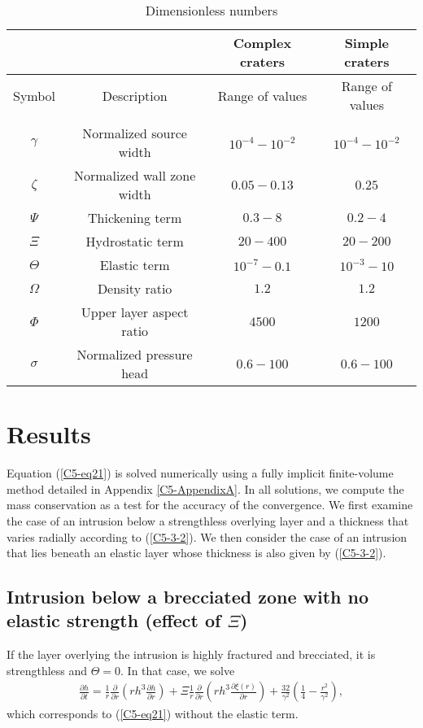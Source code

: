 \begin{table}[h!]
  \caption{Dimensionless numbers}
  \centering
  \begin{tabular}{c|c|c|c}
    &&Complex craters&Simple craters \\
    \hline
    Symbol& Description & Range of values & Range of values \\
    \hline
    &&\\
    $\gamma$&Normalized source width& $10^{-4}-10^{-2}$ &$10^{-4}-10^{-2}$ \\
    $\zeta$& Normalized wall zone width  & $0.05-0.13$&$0.25$\\
    $\Psi$&Thickening term & $0.3-8$&$0.2-4$\\
    $\Xi$& Hydrostatic term & $20-400$&$20-200$\\
    $\Theta$ &Elastic term & $10^{-7}-0.1$&$10^{-3}-10$\\
    $\Omega$ & Density ratio & $1.2$ &$1.2$\\
    $\Phi$ & Upper layer aspect ratio & $4500$ &$1200 $\\
    $\sigma$&Normalized pressure head& $0.6-100$ & $0.6-100$ 
                                                   \label{C5-tab3}
  \end{tabular} 
\end{table}
	 
	
\section{Results}
	
Equation (\ref{C5-eq21}) is solved  numerically using a fully implicit
finite-volume method detailed in  Appendix \ref{C5-AppendixA}.  In all
solutions, we compute the mass conservation as a test for the accuracy
of the convergence. We first examine  the case of an intrusion below a
strengthless  overlying layer  and  a thickness  that varies  radially
according to (\ref{C5-3-2}). We then consider the case of an intrusion
that lies  beneath an elastic layer  whose thickness is also  given by
(\ref{C5-3-2}).
	
\subsection{Intrusion below a brecciated zone with no elastic strength
  (effect of $\Xi$)}
\label{C5-Strengthless_Layer1}
If  the  layer  overlying  the   intrusion  is  highly  fractured  and
brecciated,  it is  strengthless  and $\Theta=0$.   In  that case,  we
solve
\begin{eqnarray}
  \label{C5-eq22}
  \frac{\partial h}{\partial t}=\frac{1}{r} \frac{\partial}{\partial r}\left (rh^{3} \frac{\partial h}{\partial r} \right)+ \Xi \frac{1}{r} \frac{\partial}{\partial r}\left ( rh^{3}\frac{\partial \xi(r)}{\partial r}\right )+\frac{32}{\gamma^{2}} \left(\frac{1}{4}-\frac{r^{2}}{\gamma^{2}}\right),
\end{eqnarray}
which corresponds to (\ref{C5-eq21}) without the elastic term.

